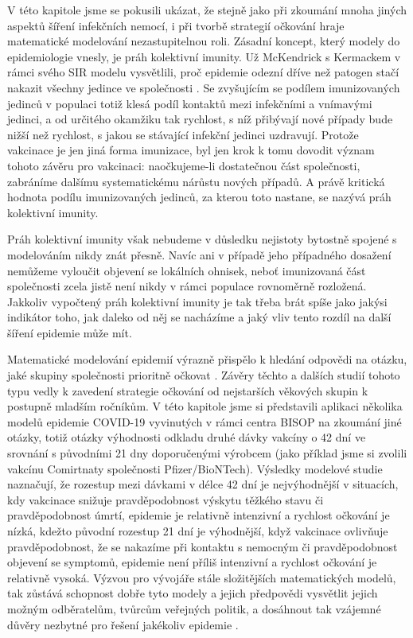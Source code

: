 V této kapitole jsme se pokusili ukázat, že stejně jako při zkoumání mnoha jiných aspektů šíření infekčních nemocí, i při tvorbě strategií očkování hraje matematické modelování nezastupitelnou roli. Zásadní koncept, který modely do epidemiologie vnesly, je práh kolektivní imunity. Už McKendrick s Kermackem v rámci svého SIR modelu vysvětlili, proč epidemie odezní dříve než patogen stačí nakazit všechny jedince ve společnosti \cite[viz také kapitola \ref{Typy_modelu}]{Bacaer2011}. Se zvyšujícím se podílem imunizovaných jedinců v populaci totiž klesá podíl kontaktů mezi infekčními a vnímavými jedinci, a od určitého okamžiku tak rychlost, s níž přibývají nové případy bude nižší než rychlost, s jakou se stávající infekční jedinci uzdravují. Protože vakcinace je jen jiná forma imunizace, byl jen krok k tomu dovodit význam tohoto závěru pro vakcinaci: naočkujeme-li dostatečnou část společnosti, zabráníme dalšímu systematickému nárůstu nových případů. A právě kritická hodnota podílu imunizovaných jedinců, za kterou toto nastane, se nazývá práh kolektivní imunity.

Práh kolektivní imunity však nebudeme v důsledku nejistoty bytostně spojené s modelováním nikdy znát přesně. Navíc ani v případě jeho případného dosažení nemůžeme vyloučit objevení se lokálních ohnisek, neboť imunizovaná část společnosti zcela jistě není nikdy v rámci populace rovnoměrně rozložená. Jakkoliv vypočtený práh kolektivní imunity je tak třeba brát spíše jako jakýsi indikátor toho, jak daleko od něj se nacházíme a jaký vliv tento rozdíl na další šíření epidemie může mít. 

Matematické modelování epidemií výrazně přispělo k hledání odpovědi na otázku, jaké skupiny společnosti prioritně očkovat \cite{Bubar_etal2021,Moore_etal2021b}. Závěry těchto a dalších studií tohoto typu vedly k zavedení strategie očkování od nejstarších věkových skupin k postupně mladším ročníkům. V této kapitole jsme si představili aplikaci několika modelů epidemie COVID-19 vyvinutých v rámci centra BISOP na zkoumání jiné otázky, totiž otázky výhodnosti odkladu druhé dávky vakcíny o 42 dní ve srovnání s původními 21 dny doporučenými výrobcem (jako příklad jsme si zvolili vakcínu Comirtnaty společnosti Pfizer/BioNTech). Výsledky modelové studie naznačují, že rozestup mezi dávkami v délce 42 dní je nejvýhodnější v situacích, kdy vakcinace snižuje pravděpodobnost výskytu těžkého stavu či pravděpodobnost úmrtí, epidemie je relativně intenzivní a rychlost očkování je nízká, kdežto původní rozestup 21 dní je výhodnější, když vakcinace ovlivňuje pravděpodobnost, že se nakazíme při kontaktu s nemocným či pravděpodobnost objevení se symptomů, epidemie není příliš intenzivní a rychlost očkování je relativně vysoká. Výzvou pro vývojáře stále složitějších matematických modelů, tak zůstává schopnost dobře tyto modely a jejich předpovědi vysvětlit jejich možným odběratelům, tvůrcům veřejných politik, a dosáhnout tak vzájemné důvěry nezbytné pro řešení jakékoliv epidemie \cite{BasuAndrews2013}.
    